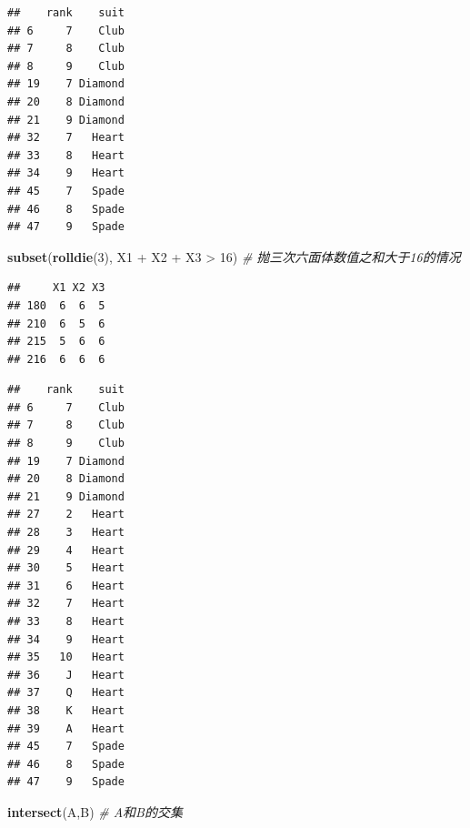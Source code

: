 \documentclass[]{article}
\newenvironment{Shaded}{\begin{snugshade}}{\end{snugshade}}
\newcommand{\KeywordTok}[1]{\textcolor[rgb]{0.13,0.29,0.53}{\textbf{{#1}}}}
\newcommand{\DecValTok}[1]{\textcolor[rgb]{0.00,0.00,0.81}{{#1}}}
\newcommand{\StringTok}[1]{\textcolor[rgb]{0.31,0.60,0.02}{{#1}}}
\newcommand{\CommentTok}[1]{\textcolor[rgb]{0.56,0.35,0.01}{\textit{{#1}}}}
\newcommand{\NormalTok}[1]{{#1}}
\begin{document}
\begin{verbatim}
##    rank    suit
## 6     7    Club
## 7     8    Club
## 8     9    Club
## 19    7 Diamond
## 20    8 Diamond
## 21    9 Diamond
## 32    7   Heart
## 33    8   Heart
## 34    9   Heart
## 45    7   Spade
## 46    8   Spade
## 47    9   Spade
\end{verbatim}

\begin{Shaded}
\begin{Highlighting}[]
\KeywordTok{subset}\NormalTok{(}\KeywordTok{rolldie}\NormalTok{(}\DecValTok{3}\NormalTok{), }
       \NormalTok{X1 +}\StringTok{ }\NormalTok{X2 +}\StringTok{ }\NormalTok{X3 >}\StringTok{ }\DecValTok{16}\NormalTok{) }\CommentTok{# 抛三次六面体数值之和大于16的情况}
\end{Highlighting}
\end{Shaded}

\begin{verbatim}
##     X1 X2 X3
## 180  6  6  5
## 210  6  5  6
## 215  5  6  6
## 216  6  6  6
\end{verbatim}

\begin{Shaded}
\end{Shaded}

\begin{verbatim}
##    rank    suit
## 6     7    Club
## 7     8    Club
## 8     9    Club
## 19    7 Diamond
## 20    8 Diamond
## 21    9 Diamond
## 27    2   Heart
## 28    3   Heart
## 29    4   Heart
## 30    5   Heart
## 31    6   Heart
## 32    7   Heart
## 33    8   Heart
## 34    9   Heart
## 35   10   Heart
## 36    J   Heart
## 37    Q   Heart
## 38    K   Heart
## 39    A   Heart
## 45    7   Spade
## 46    8   Spade
## 47    9   Spade
\end{verbatim}

\begin{Shaded}
\begin{Highlighting}[]
\KeywordTok{intersect}\NormalTok{(A,B) }\CommentTok{# A和B的交集}
\end{Highlighting}
\end{Shaded}
\end{document}
